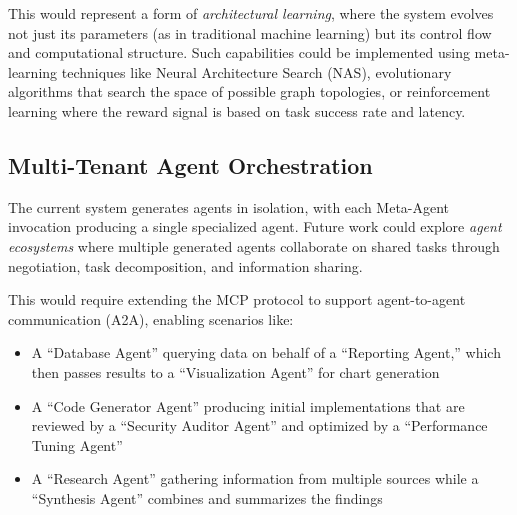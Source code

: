 \documentclass[lettersize,journal]{IEEEtran}
\begin{document}
This would represent a form of \textit{architectural learning}, where the system evolves not just its parameters (as in traditional machine learning) but its control flow and computational structure. Such capabilities could be implemented using meta-learning techniques like Neural Architecture Search (NAS), evolutionary algorithms that search the space of possible graph topologies, or reinforcement learning where the reward signal is based on task success rate and latency.

\subsection{Multi-Tenant Agent Orchestration}
The current system generates agents in isolation, with each Meta-Agent invocation producing a single specialized agent. Future work could explore \textit{agent ecosystems} where multiple generated agents collaborate on shared tasks through negotiation, task decomposition, and information sharing.

This would require extending the MCP protocol to support agent-to-agent communication (A2A), enabling scenarios like:
\begin{itemize}
    \item A ``Database Agent'' querying data on behalf of a ``Reporting Agent,'' which then passes results to a ``Visualization Agent'' for chart generation
    \item A ``Code Generator Agent'' producing initial implementations that are reviewed by a ``Security Auditor Agent'' and optimized by a ``Performance Tuning Agent''
    \item A ``Research Agent'' gathering information from multiple sources while a ``Synthesis Agent'' combines and summarizes the findings
\end{itemize}
\end{document}
